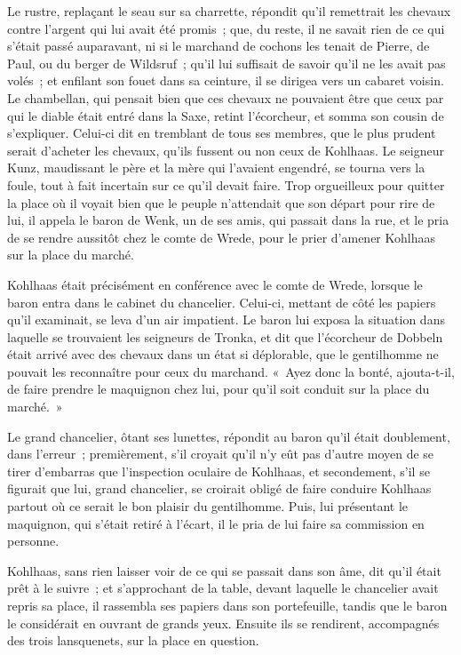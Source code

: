 \documentclass[french,twoside]{book} %
\begin{document}
Le rustre, replaçant le seau sur sa charrette, répondit qu’il remettrait les chevaux contre l’argent qui lui avait été promis ; que, du reste, il ne savait rien de ce qui s’était passé auparavant, ni si le marchand de cochons les tenait de Pierre, de Paul, ou du berger de Wildsruf ; qu’il lui suffisait de savoir qu’il ne les avait pas volés ; et enfilant son fouet dans sa ceinture, il se dirigea vers un cabaret voisin. Le chambellan, qui pensait bien que ces chevaux ne pouvaient être que ceux par qui le diable était entré dans la Saxe, retint l’écorcheur, et somma son cousin de s’expliquer. Celui-ci dit en tremblant de tous ses membres, que le plus prudent serait d’acheter les chevaux, qu’ils fussent ou non ceux de Kohlhaas. Le seigneur Kunz, maudissant le père et la mère qui l’avaient engendré, se tourna vers la foule, tout à fait incertain sur ce qu’il devait faire. Trop orgueilleux pour quitter la place où il voyait bien que le peuple n’attendait que son départ pour rire de lui, il appela le baron de Wenk, un de ses amis, qui passait dans la rue, et le pria de se rendre aussitôt chez le comte de Wrede, pour le prier d’amener Kohlhaas sur la place du marché.\par
Kohlhaas était précisément en conférence avec le comte de Wrede, lorsque le baron entra dans le cabinet du chancelier. Celui-ci, mettant de côté les papiers qu’il examinait, se leva d’un air impatient. Le baron lui exposa la situation dans laquelle se trouvaient les seigneurs de Tronka, et dit que l’écorcheur de Dobbeln était arrivé avec des chevaux dans un état si déplorable, que le gentilhomme ne pouvait les reconnaître pour ceux du marchand. « Ayez donc la bonté, ajouta-t-il, de faire prendre le maquignon chez lui, pour qu’il soit conduit sur la place du marché. »\par
Le grand chancelier, ôtant ses lunettes, répondit au baron qu’il était doublement, dans l’erreur ; premièrement, s’il croyait qu’il n’y eût pas d’autre moyen de se tirer d’embarras que l’inspection oculaire de Kohlhaas, et secondement, s’il se figurait que lui, grand chancelier, se croirait obligé de faire conduire Kohlhaas partout où ce serait le bon plaisir du gentilhomme. Puis, lui présentant le maquignon, qui s’était retiré à l’écart, il le pria de lui faire sa commission en personne.\par
Kohlhaas, sans rien laisser voir de ce qui se passait dans son âme, dit qu’il était prêt à le suivre ; et s’approchant de la table, devant laquelle le chancelier avait repris sa place, il rassembla ses papiers dans son portefeuille, tandis que le baron le considérait en ouvrant de grands yeux. Ensuite ils se rendirent, accompagnés des trois lansquenets, sur la place en question.\par
\end{document}
